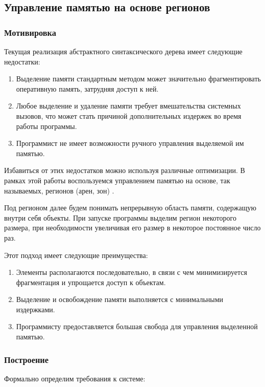 \subsection{Управление памятью на основе регионов}
\subsubsection{Мотивировка}
Текущая реализация абстрактного синтаксического дерева имеет следующие недостатки:
\begin{enumerate}
    \item Выделение памяти стандартным методом может значительно фрагментировать оперативную память, затрудняя доступ к ней.
    \item Любое выделение и удаление памяти требует вмешательства системных вызовов, что может стать причиной дополнительных издержек во время работы программы.
    \item Программист не имеет возможности ручного управления выделяемой им памятью.
\end{enumerate}

Избавиться от этих недостатков можно используя различные оптимизации. В рамках этой работы воспользуемся управлением памятью на основе, так называемых, регионов (арен, зон) \cite{Wang}.

Под регионом далее будем понимать непрерывную область памяти, содержащую внутри себя объекты. При запуске программы выделим регион некоторого размера, при необходимости увеличивая его размер в некоторое постоянное число раз.

Этот подход имеет следующие преимущества:
\begin{enumerate}
    \item Элементы располагаются последовательно, в связи с чем минимизируется фрагментация и упрощается доступ к объектам.
    \item Выделение и освобождение памяти выполняется с минимальными издержками.
    \item Программисту предоставляется большая свобода для управления выделенной памятью.
\end{enumerate}

\subsubsection{Построение}
Формально определим требования к системе:

